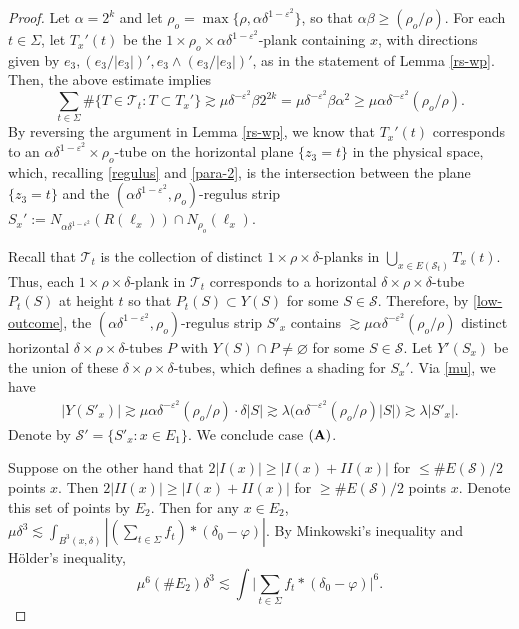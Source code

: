 \documentclass{amsart}%
\numberwithin{equation}{section}
\newcommand{\al}{\alpha}
\newcommand{\be}{\beta}
\newcommand{\de}{\delta}
\newcommand{\e}{\varepsilon}
\newcommand{\la}{\lambda}
\newcommand{\Si}{\Sigma}
\newcommand{\vp}{\varphi}
\newcommand{\cs}{\mathcal S}
\newcommand{\cT}{{\mathcal T}}
\newcommand{\1}{\mathbbm{1}}
\begin{document}
\begin{proof}
Let $\al=2^k$ and let $\rho_o=\max\{\rho, \al\de^{1-\e^2}\}$, so that $\al\be\geq(\rho_o/\rho)$. 
For each $t\in\Si$, let $T_x'(t)$ be the $1\times\rho_o\times\al\de^{1-\e^2}$-plank containing $x$, with directions given by $e_3, (e_3/|e_3|)', e_3\wedge (e_3/|e_3|)'$, as in the statement of Lemma \ref{rs-wp}. 
Then, the above estimate implies 
\begin{equation}
\label{low-outcome}
    \sum_{t\in\Si}\#\{T\in\cT_t:T\subset T_x'\}\gtrsim\mu\de^{-\e^2}\beta2^{2k}=\mu\de^{-\e^2}\beta\al^2\geq\mu\al\de^{-\e^2}(\rho_o/\rho).
\end{equation}
By reversing the argument in Lemma \ref{rs-wp}, we know that $T_x'(t)$ corresponds to an $\al\de^{1-\e^2}\times\rho_o$-tube on the horizontal plane $\{z_3=t\}$ in the physical space,
which, recalling \eqref{regulus} and \eqref{para-2}, is the intersection between the plane $\{z_3=t\}$ and the $(\al\de^{1-\e^2}, \rho_o)$-regulus strip $S_x':=N_{\al\de^{1-\e^2}}(R(\ell_x))\cap N_{\rho_o}(\ell_x)$.

Recall that $\cT_t$ is the collection of distinct $1\times\rho\times\de$-planks in $\bigcup_{x\in E(\cs_t)} T_x(t)$.
Thus, each $1\times\rho\times\de$-plank in $\cT_t$ corresponds to a horizontal $\de\times\rho\times\de$-tube $P_t(S)$ at height $t$ so that $ P_t(S)\subset Y(S)$ for some $S\in\cs$.
Therefore, by \eqref{low-outcome}, the $(\al\de^{1-\e^2}, \rho_o)$-regulus strip $S'_x$ contains $\gtrsim \mu\al\de^{-\e^2}(\rho_o/\rho)$ distinct horizontal $\de\times\rho\times\de$-tubes $P$ with $Y(S)\cap P\not=\varnothing$ for some $S\in\cs$.
Let $Y'(S_x)$ be the union of these $\de\times\rho\times\de$-tubes, which defines a shading for $S_x'$.
Via \eqref{mu}, we have
\begin{align}
    |Y(S'_x)|\gtrsim\mu\al\de^{-\e^2}(\rho_o/\rho)\cdot\de|S|\gtrsim\la\big(\al\de^{-\e^2}(\rho_o/\rho)|S|\big)\gtrsim\la|S'_x|.
\end{align}
Denote by $\cs'=\{S'_x:x\in E_1\}$. We conclude case ${\bf (A)}$.

\medskip


Suppose on the other hand that $2|I(x)|\geq|I(x)+II(x)|$ for $\leq \# E(\cs)/2$ points $x$. Then $2|II(x)|\geq|I(x)+II(x)|$ for $\geq \# E(\cs)/2$ points $x$. 
Denote this set of points by $E_2$. 
Then for any $x\in E_2$, $\mu\de^3\lesssim\int_{B^3(x,\de)}|(\sum_{t\in\Si} f_t)\ast(\delta_0-\vp)|$.
By Minkowski's inequality and H\"older's inequality, 
\begin{equation}
    \mu^6(\#E_2)\de^3 \lesssim\int\Big|\sum_{t\in\Si} f_t\ast(\delta_0-\vp)\Big|^6.
\end{equation}


\end{proof}
\end{document}

